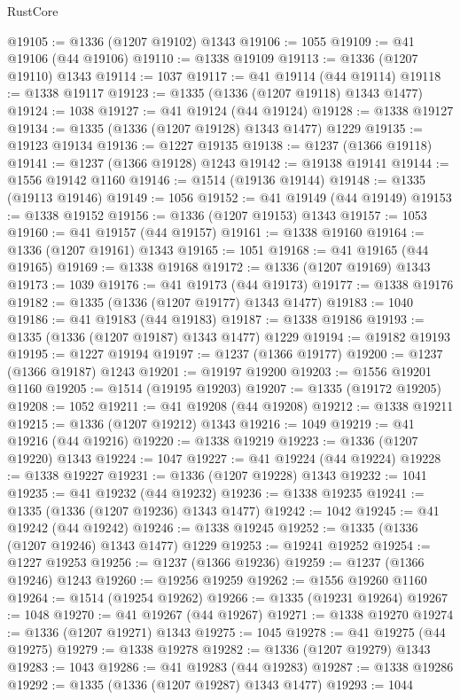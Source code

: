 \begin{lexlean}{RustCore}
\begin{coremodule}
@19105 := @1336 (@1207 @19102) @1343
@19106 := 1055
@19109 := @41 @19106 (@44 @19106)
@19110 := @1338 @19109
@19113 := @1336 (@1207 @19110) @1343
@19114 := 1037
@19117 := @41 @19114 (@44 @19114)
@19118 := @1338 @19117
@19123 := @1335 (@1336 (@1207 @19118) @1343 @1477)
@19124 := 1038
@19127 := @41 @19124 (@44 @19124)
@19128 := @1338 @19127
@19134 := @1335 (@1336 (@1207 @19128) @1343 @1477) @1229
@19135 := @19123 @19134
@19136 := @1227 @19135
@19138 := @1237 (@1366 @19118)
@19141 := @1237 (@1366 @19128) @1243
@19142 := @19138 @19141
@19144 := @1556 @19142 @1160
@19146 := @1514 (@19136 @19144)
@19148 := @1335 (@19113 @19146)
@19149 := 1056
@19152 := @41 @19149 (@44 @19149)
@19153 := @1338 @19152
@19156 := @1336 (@1207 @19153) @1343
@19157 := 1053
@19160 := @41 @19157 (@44 @19157)
@19161 := @1338 @19160
@19164 := @1336 (@1207 @19161) @1343
@19165 := 1051
@19168 := @41 @19165 (@44 @19165)
@19169 := @1338 @19168
@19172 := @1336 (@1207 @19169) @1343
@19173 := 1039
@19176 := @41 @19173 (@44 @19173)
@19177 := @1338 @19176
@19182 := @1335 (@1336 (@1207 @19177) @1343 @1477)
@19183 := 1040
@19186 := @41 @19183 (@44 @19183)
@19187 := @1338 @19186
@19193 := @1335 (@1336 (@1207 @19187) @1343 @1477) @1229
@19194 := @19182 @19193
@19195 := @1227 @19194
@19197 := @1237 (@1366 @19177)
@19200 := @1237 (@1366 @19187) @1243
@19201 := @19197 @19200
@19203 := @1556 @19201 @1160
@19205 := @1514 (@19195 @19203)
@19207 := @1335 (@19172 @19205)
@19208 := 1052
@19211 := @41 @19208 (@44 @19208)
@19212 := @1338 @19211
@19215 := @1336 (@1207 @19212) @1343
@19216 := 1049
@19219 := @41 @19216 (@44 @19216)
@19220 := @1338 @19219
@19223 := @1336 (@1207 @19220) @1343
@19224 := 1047
@19227 := @41 @19224 (@44 @19224)
@19228 := @1338 @19227
@19231 := @1336 (@1207 @19228) @1343
@19232 := 1041
@19235 := @41 @19232 (@44 @19232)
@19236 := @1338 @19235
@19241 := @1335 (@1336 (@1207 @19236) @1343 @1477)
@19242 := 1042
@19245 := @41 @19242 (@44 @19242)
@19246 := @1338 @19245
@19252 := @1335 (@1336 (@1207 @19246) @1343 @1477) @1229
@19253 := @19241 @19252
@19254 := @1227 @19253
@19256 := @1237 (@1366 @19236)
@19259 := @1237 (@1366 @19246) @1243
@19260 := @19256 @19259
@19262 := @1556 @19260 @1160
@19264 := @1514 (@19254 @19262)
@19266 := @1335 (@19231 @19264)
@19267 := 1048
@19270 := @41 @19267 (@44 @19267)
@19271 := @1338 @19270
@19274 := @1336 (@1207 @19271) @1343
@19275 := 1045
@19278 := @41 @19275 (@44 @19275)
@19279 := @1338 @19278
@19282 := @1336 (@1207 @19279) @1343
@19283 := 1043
@19286 := @41 @19283 (@44 @19283)
@19287 := @1338 @19286
@19292 := @1335 (@1336 (@1207 @19287) @1343 @1477)
@19293 := 1044

\end{coremodule}
\end{lexlean}
